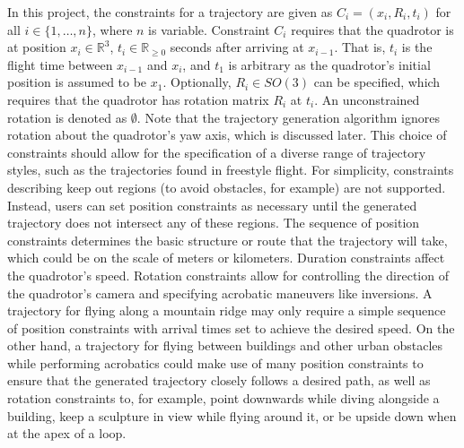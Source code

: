 \documentclass[pageno]{jpaper}
\begin{document}
In this project, the constraints for a trajectory are given as $C_i = (x_i, R_i, t_i)$ for all $i \in \{1, \dots, n\}$, where $n$ is variable. Constraint $C_i$ requires that the quadrotor is at position $x_i \in \mathbb{R}^3$, $t_i \in \mathbb{R}_{\geq 0}$ seconds after arriving at $x_{i-1}$. That is, $t_i$ is the flight time between $x_{i-1}$ and $x_i$, and $t_1$ is arbitrary as the quadrotor's initial position is assumed to be $x_1$. Optionally, $R_i \in SO(3)$ can be specified, which requires that the quadrotor has rotation matrix $R_i$ at $t_i$. An unconstrained rotation is denoted as $\emptyset$. Note that the trajectory generation algorithm ignores rotation about the quadrotor's yaw axis, which is discussed later. This choice of constraints should allow for the specification of a diverse range of trajectory styles, such as the trajectories found in freestyle flight. For simplicity, constraints describing keep out regions (to avoid obstacles, for example) are not supported. Instead, users can set position constraints as necessary until the generated trajectory does not intersect any of these regions. The sequence of position constraints determines the basic structure or route that the trajectory will take, which could be on the scale of meters or kilometers. Duration constraints affect the quadrotor's speed. Rotation constraints allow for controlling the direction of the quadrotor's camera and specifying acrobatic maneuvers like inversions. A trajectory for flying along a mountain ridge may only require a simple sequence of position constraints with arrival times set to achieve the desired speed. On the other hand, a trajectory for flying between buildings and other urban obstacles while performing acrobatics could make use of many position constraints to ensure that the generated trajectory closely follows a desired path, as well as rotation constraints to, for example, point downwards while diving alongside a building, keep a sculpture in view while flying around it, or be upside down when at the apex of a loop.
\end{document}

